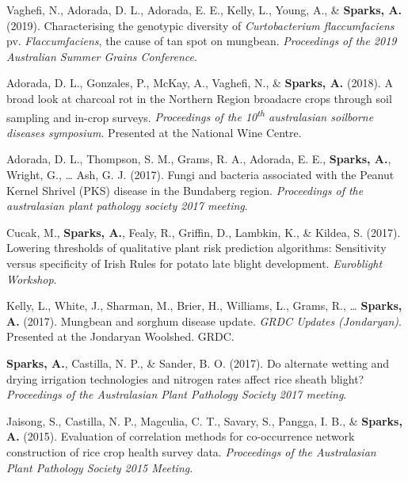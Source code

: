 \documentclass[11pt, a4paper]{awesome-cv}
\begin{document}
\leavevmode{}%
Vaghefi, N., Adorada, D. L., Adorada, E. E., Kelly, L., Young, A., \&
\textbf{Sparks, A.} (2019). Characterising the genotypic diversity of
{\emph{Curtobacterium flaccumfaciens}} pv. \emph{Flaccumfaciens}, the
cause of tan spot on mungbean. \emph{Proceedings of the 2019 Australian
Summer Grains Conference}.

\leavevmode{}%
Adorada, D. L., Gonzales, P., McKay, A., Vaghefi, N., \&
\textbf{Sparks, A.} (2018). A broad look at charcoal rot in the
{Northern Region} broadacre crops through soil sampling and in-crop
surveys. \emph{Proceedings of the 10\textsuperscript{th} australasian
soilborne diseases symposium}. Presented at the National Wine Centre.

\leavevmode{}%
Adorada, D. L., Thompson, S. M., Grams, R. A., Adorada, E. E.,
\textbf{Sparks, A.}, Wright, G., \ldots{} Ash, G. J. (2017). Fungi and
bacteria associated with the {Peanut Kernel Shrivel (PKS)} disease in
the {Bundaberg} region. \emph{Proceedings of the australasian plant
pathology society 2017 meeting}.

\leavevmode{}%
Cucak, M., \textbf{Sparks, A.}, Fealy, R., Griffin, D., Lambkin, K., \&
Kildea, S. (2017). Lowering thresholds of qualitative plant risk
prediction algorithms: Sensitivity versus specificity of {Irish Rules}
for potato late blight development. \emph{Euroblight Workshop}.

\leavevmode{}%
Kelly, L., White, J., Sharman, M., Brier, H., Williams, L., Grams, R.,
\ldots{} \textbf{Sparks, A.} (2017). Mungbean and sorghum disease
update. \emph{GRDC Updates (Jondaryan)}. Presented at the Jondaryan
Woolshed. GRDC.

\leavevmode{}%
\textbf{Sparks, A.}, Castilla, N. P., \& Sander, B. O. (2017). Do
alternate wetting and drying irrigation technologies and nitrogen rates
affect rice sheath blight? \emph{Proceedings of the {Australasian Plant
Pathology Society} 2017 meeting}.

\leavevmode{}%
Jaisong, S., Castilla, N. P., Magculia, C. T., Savary, S., Pangga, I.
B., \& \textbf{Sparks, A.} (2015). Evaluation of correlation methods for
co-occurrence network construction of rice crop health survey data.
\emph{Proceedings of the Australasian Plant Pathology Society 2015
Meeting}.
\end{document}
